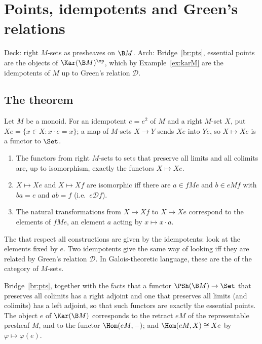 \section{Points, idempotents and Green's relations}\label{sec:points}

Deck: right $M$-sets as presheaves on $\B M$. Arch: Bridge~\ref{br:pts}, essential points are the objects of $\Kar(\B M)^{\op}$, which by Example~\ref{ex:karM} are the idempotents of $M$ up to Green's relation $\mathcal D$.

\subsection{The theorem}

\begin{theorem}\label{th:points}
Let $M$ be a monoid. For an idempotent $e = e^2$ of $M$ and a right $M$-set $X$, put $Xe = \{x\in X : x\cdot e = x\}$; a map of $M$-sets $X\to Y$ sends $Xe$ into $Ye$, so $X\mapsto Xe$ is a functor to $\Set$.
\begin{enumerate}
\item The functors from right $M$-sets to sets that preserve all limits and all colimits are, up to isomorphism, exactly the functors $X\mapsto Xe$.
\item $X\mapsto Xe$ and $X\mapsto Xf$ are isomorphic iff there are $a\in fMe$ and $b\in eMf$ with $ba = e$ and $ab = f$ (i.e.\ $e\mathrel{\mathcal D}f$).
\item The natural transformations from $X\mapsto Xf$ to $X\mapsto Xe$ correspond to the elements of $fMe$, an element $a$ acting by $x\mapsto x\cdot a$.
\end{enumerate}
\end{theorem}

\inwords{} The  that respect all constructions are given by the idempotents: look at the elements fixed by $e$. Two idempotents give the same way of looking iff they are related by Green's relation $\mathcal D$. In Galois-theoretic language, these are the  of the category of $M$-sets.

\gen{} Bridge~\ref{br:pts}, together with the facts that a functor $\PSh(\B M)\to\Set$ that preserves all colimits has a right adjoint and one that preserves all limits (and colimits) has a left adjoint, so that such functors are exactly the essential points. The object $e$ of $\Kar(\B M)$ corresponds to the retract $eM$ of the representable presheaf $M$, and to the functor $\Hom(eM,-)$; and $\Hom(eM,X)\cong Xe$ by $\varphi\mapsto\varphi(e)$.

